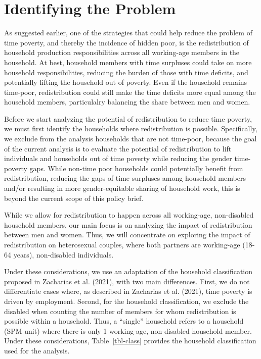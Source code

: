 \documentclass[
  11pt,
]{article}
\begin{document}
\section{Identifying the Problem}\label{sec-problem}

As suggested earlier, one of the strategies that could help reduce the
problem of time poverty, and thereby the incidence of hidden poor, is
the redistribution of household production responsibilities across all
working-age members in the household. At best, household members with
time surpluses could take on more household responsibilities, reducing
the burden of those with time deficits, and potentially lifting the
household out of poverty. Even if the household remains time-poor,
redistribution could still make the time deficits more equal among the
household members, particulalry balancing the share between men and
women.

Before we start analyzing the potential of redistribution to reduce time
poverty, we must first identify the households where redistribution is
possible. Specifically, we exclude from the analysis households that are
not time-poor, because the goal of the current analysis is to evaluate
the potential of redistribution to lift individuals and households out
of time poverty while reducing the gender time-poverty gaps. While
non-time poor households could potentially benefit from redistribution,
reducing the gaps of time surpluses among household members and/or
resulting in more gender-equitable sharing of household work, this is
beyond the current scope of this policy brief.

While we allow for redistribution to happen across all working-age,
non-disabled household members, our main focus is on analyzing the
impact of redistribution between men and women. Thus, we will
concentrate on exploring the impact of redistribution on heterosexual
couples, where both partners are working-age (18-64 years), non-disabled
individuals.

Under these considerations, we use an adaptation of the household
classification proposed in Zacharias et al. (2021), with two main
differences. First, we do not differentiate cases where, as described in
Zacharias et al. (2021), time poverty is driven by employment. Second,
for the household classification, we exclude the disabled when counting
the number of members for whom redistribution is possible within a
household. Thus, a ``single'' household refers to a household (SPM unit)
where there is only 1 working-age, non-disabled household member. Under
these considerations, Table~\ref{tbl-class} provides the household
classification used for the analysis.
\end{document}
